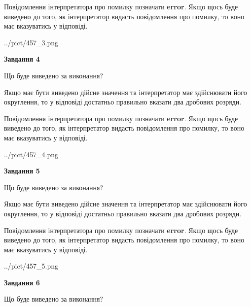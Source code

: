 \documentclass[12pt, ukrainian]{article}
\begin{document}
{\begin {Large}
Повідомлення інтерпретатора про помилку позначати \textbf{error}.
Якщо щось буде виведено до того, як інтерпретатор видасть повідомлення про помилку, 
то воно має вказуватись у відповіді. \par

\begin{center}
	{../pict/457_3.png}
\end{center}
\newpage

{\begin {center}\textbf{Завдання 4}\end {center}}\par
Що буде виведено за виконання? \par

Якщо має бути виведено дійсне значення та інтерпретатор має здійснювати його округлення, 
то у відповіді достатньо правильно вказати два дробових розряди.

Повідомлення інтерпретатора про помилку позначати \textbf{error}.
Якщо щось буде виведено до того, як інтерпретатор видасть повідомлення про помилку, 
то воно має вказуватись у відповіді. \par

\begin{center}
	{../pict/457_4.png}
\end{center}
\newpage

{\begin {center}\textbf{Завдання 5}\end {center}}\par
Що буде виведено за виконання? \par

Якщо має бути виведено дійсне значення та інтерпретатор має здійснювати його округлення, 
то у відповіді достатньо правильно вказати два дробових розряди.

Повідомлення інтерпретатора про помилку позначати \textbf{error}.
Якщо щось буде виведено до того, як інтерпретатор видасть повідомлення про помилку, 
то воно має вказуватись у відповіді. \par

\begin{center}
	{../pict/457_5.png}
\end{center}
\newpage

{\begin {center}\textbf{Завдання 6}\end {center}}\par
Що буде виведено за виконання? \par


\end{Large}}
\end{document}
